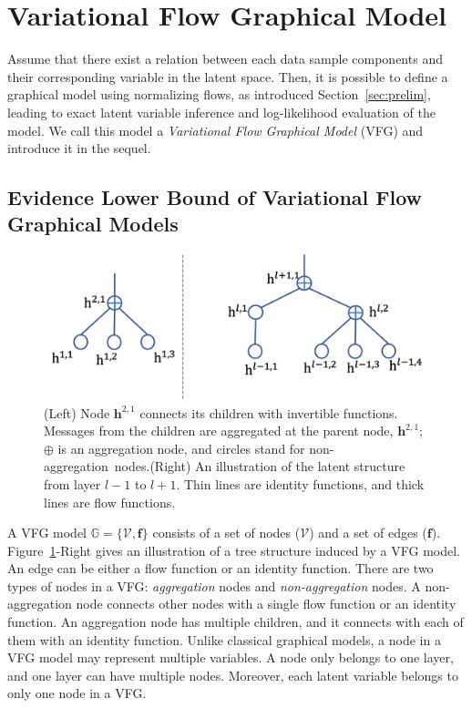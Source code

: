\documentclass[sigconf, anonymous, review]{acmart}
\theoremstyle{plain}
\theoremstyle{definition}
\theoremstyle{remark}
\begin{document}
\vspace{-0.1in}
\section{Variational Flow Graphical Model}\label{sec:main}

Assume that there exist a relation between each data sample components and their corresponding variable in the latent space.
Then, it is possible to define a graphical model using normalizing flows, as introduced Section~\ref{sec:prelim}, leading to exact latent variable inference and log-likelihood evaluation of the model. 
We call this model a \textit{Variational Flow Graphical Model} (VFG) and introduce it in the sequel.
\subsection{Evidence Lower Bound of Variational Flow Graphical Models}
\begin{figure}
\vspace{-0.05in}
\begin{center}
 \includegraphics[width=0.8\linewidth]{fig/tree_node.png}
\end{center}
\vspace{-0.15in}
\caption{\small  (Left)  Node $\mathbf{h}^{2, 1}$ connects its children with invertible functions. Messages from the children are aggregated at the parent node, $\mathbf{h}^{2,1}$; $\oplus$ is an aggregation node, and circles stand for non-aggregation~nodes.(Right) An illustration of the latent structure from layer $l-1$ to $l+1$.  Thin lines are identity functions, and thick lines are flow functions.  }
\label{fig:tree}
\vspace{-0.1in}
\end{figure}
A VFG model  $\mathbb{G}=\{\mathcal{V}, \mathbf{f}\} $ consists of a set of nodes ($\mathcal{V}$) and a set of edges ($\mathbf{f}$).
Figure~\ref{fig:tree}-Right gives an illustration of a tree structure induced by a VFG model. An edge can be either a flow function or an identity function. There are two types of nodes in a VFG: \emph{aggregation} nodes and \emph{non-aggregation} nodes. 
A non-aggregation node connects other nodes with a single flow function or an identity function. An aggregation node has multiple children, and it  connects with each of  them with an identity function. 	Unlike classical graphical models, a node in a VFG model may represent multiple variables. A node only belongs to one layer, and one layer can have multiple nodes. Moreover, each latent variable belongs to only one node in a VFG. 
\end{document}
